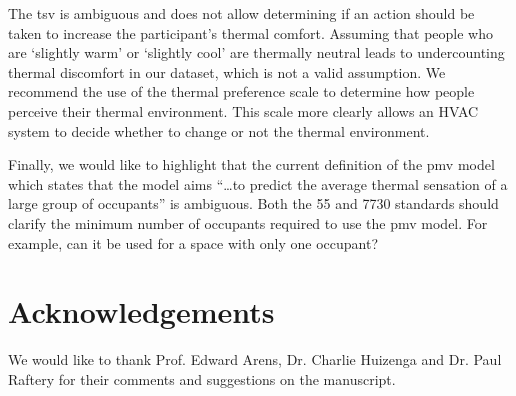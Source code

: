 The \ac{tsv} is ambiguous and does not allow determining if an action should be taken to increase the participant's thermal comfort.
Assuming that people who are `slightly warm' or `slightly cool' are thermally neutral leads to undercounting thermal discomfort in our dataset, which is not a valid assumption.
We recommend the use of the thermal preference scale to determine how people perceive their thermal environment. 
This scale more clearly allows an HVAC system to decide whether to change or not the thermal environment.

Finally, we would like to highlight that the current definition of the \ac{pmv} model which states that the model aims ``\ldots to predict the average thermal sensation of a large group of occupants'' is ambiguous.
Both the \gls{55} and \gls{7730} standards should clarify the minimum number of occupants required to use the \ac{pmv} model.
For example, can it be used for a space with only one occupant?

\section*{Acknowledgements}\label{sec:acknowledgements}
We would like to thank Prof. Edward Arens, Dr. Charlie Huizenga and Dr. Paul Raftery for their comments and suggestions on the manuscript.